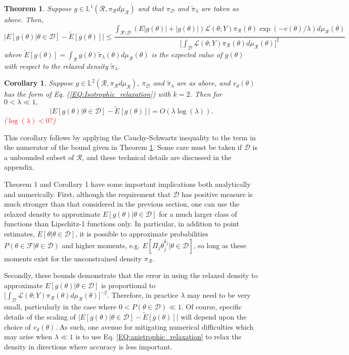 \documentclass[12 point]{article}
\newtheorem{theorem_pos_measure}{Theorem}
\newtheorem{corollary}{Corollary}
\newcommand{\leo}[1]{\textcolor{red}{ (#1)}}
\begin{document}
\begin{theorem_pos_measure}
\label{THM:positive_measure_approximation_error}
Suppose $g \in \mathbb{L}^1(\mathcal{R}, \pi_\mathcal{R}d\mu_\mathcal{R})$ and that $\pi_\mathcal{D}$ and $\tilde{\pi}_\lambda$ are taken as above.  Then,
$$\bigg|E[g(\theta) |\theta\in\mathcal{D}] - \tilde{E}[g(\theta)]   \bigg| \le \frac{\int_{\mathcal{R}\setminus \mathcal{D}} (E|g(\theta)|+|g(\theta)|) \mathcal{L}(\theta; Y) \pi_\mathcal{R}(\theta)\exp(-v(\theta)/\lambda ) d\mu_\mathcal{R}(\theta)}{\big[\int_\mathcal{D} \mathcal{L}(\theta; Y) \pi_\mathcal{R}(\theta)d\mu_\mathcal{R}(\theta)\big]^2 }$$
where $\tilde{E}[g(\theta)] = \int_\mathcal{R} g(\theta) \tilde{\pi}_\lambda(\theta)d\mu_\mathcal{R}(\theta)$ is the expected value of $g(\theta)$ with respect to the relaxed density $\tilde{\pi}_\lambda.$
\end{theorem_pos_measure}

\begin{corollary}
Suppose $g \in  \mathbb{L}^2(\mathcal{R}, \pi_\mathcal{R}d\mu_\mathcal{R})$,  $\pi_\mathcal{D}$ and $\tilde{\pi}_\lambda$ are as above, and $v_d(\theta)$ has the form of Eq. (\ref{EQ:Isotrophic_relaxation}) with $k=2$.  Then for $0<\lambda \ll 1,$
$$ \bigg|E[g(\theta) |\theta\in\mathcal{D}] - \tilde{E}[g(\theta)]   \bigg| = O(\lambda\log(\lambda)).  $$ \leo{$\log(\lambda)<0?$}
\end{corollary}
This corollary follows by applying the Cauchy-Schwartz inequality to the term in the numerator of the bound given in Theorem \ref{THM:positive_measure_approximation_error}.  Some care must be taken if $\mathcal{D}$ is a unbounded subset of $\mathcal{R}$, and these technical details are discussed in the appendix.

Theorem 1 and Corollary 1 have some important implications both analytically and numerically.  First, although the requirement that $\mathcal{D}$ has positive measure is much stronger than that considered in the previous section, one can use the relaxed density to approximate $E[g(\theta)|\theta\in\mathcal{D}]$ for a much larger class of functions than Lipschitz-1 functions only.  In particular, in addition to point estimates, $E[\theta|\theta\in\mathcal{D}]$, it is possible to approximate probabilities $P(\theta \in \mathcal{F}|\theta \in \mathcal{D})$ and higher moments, e.g. $E[\Pi_j \theta_j^{k_j} |\theta\in\mathcal{D}]$, so long as these moments exist for the unconstrained density $\pi_\mathcal{R}.$ 

Secondly, these bounds demonstrate that the error in using the relaxed density to approximate $E[g(\theta)|\theta\in\mathcal{D}]$ is proportional to $[\int_\mathcal{D}\mathcal{L}(\theta; Y)  \pi_\mathcal{R}(\theta)d\mu_\mathcal{R}(\theta)\big]^{-2}.$  Therefore, in practice $\lambda$ may need to be very small, particularly in the case where $0<P(\theta\in\mathcal{D})\ll 1.$ Of course, specific details of the scaling of $\bigg|E[g(\theta) |\theta\in\mathcal{D}] - \tilde{E}[g(\theta)]   \bigg|$ will depend upon the choice of $v_d(\theta)$. As such, one avenue for mitigating numerical difficulties which may arise when $\lambda \ll 1$ is to use Eq. \ref{EQ:anistrophic_relaxation} to relax the density in directions where accuracy is less important.
\end{document}
